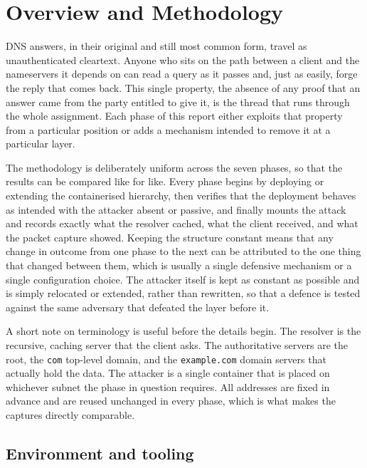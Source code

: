 \documentclass[11pt]{article}
\begin{document}
\newpage
\tableofcontents
\newpage

\clearpage

\section{Overview and Methodology}

DNS answers, in their original and still most common form, travel as
unauthenticated cleartext. Anyone who sits on the path between a client and the
nameservers it depends on can read a query as it passes and, just as easily,
forge the reply that comes back. This single property, the absence of any proof
that an answer came from the party entitled to give it, is the thread that runs
through the whole assignment. Each phase of this report either exploits that
property from a particular position or adds a mechanism intended to remove it at
a particular layer.

The methodology is deliberately uniform across the seven phases, so that the
results can be compared like for like. Every phase begins by deploying or
extending the containerised hierarchy, then verifies that the deployment behaves
as intended with the attacker absent or passive, and finally mounts the attack
and records exactly what the resolver cached, what the client received, and what
the packet capture showed. Keeping the structure constant means that any change
in outcome from one phase to the next can be attributed to the one thing that
changed between them, which is usually a single defensive mechanism or a single
configuration choice. The attacker itself is kept as constant as possible and is
simply relocated or extended, rather than rewritten, so that a defence is tested
against the same adversary that defeated the layer before it.

A short note on terminology is useful before the details begin. The resolver is
the recursive, caching server that the client asks. The authoritative servers are
the root, the \texttt{com} top-level domain, and the \texttt{example.com} domain
servers that actually hold the data. The attacker is a single container that is
placed on whichever subnet the phase in question requires. All addresses are fixed
in advance and are reused unchanged in every phase, which is what makes the captures
directly comparable.

\subsection{Environment and tooling}
\end{document}
